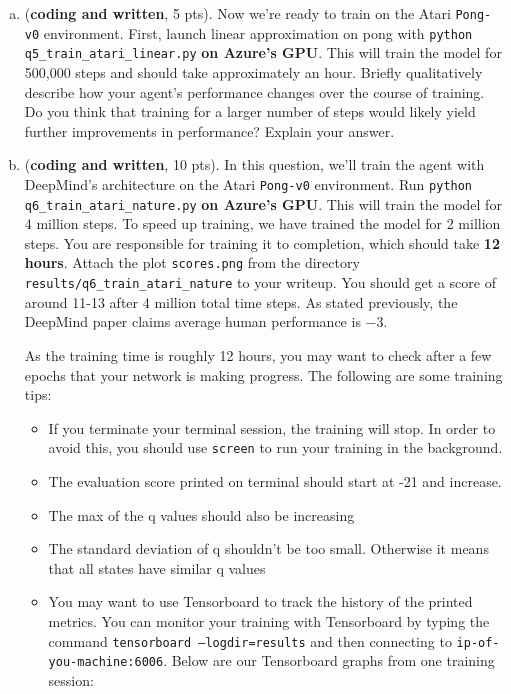 \documentclass{article}
\newif\ifanswers
\newenvironment{myitemize}
{ \begin{itemize}
    \setlength{\itemsep}{0pt}
    \setlength{\parskip}{0pt}
    \setlength{\parsep}{0pt}     }
  { \end{itemize}                  }
\newcommand{\ifans}[1]{\ifanswers \color{red} \textbf{Solution: } #1 \color{black} \else {} \fi}
\begin{document}
\begin{enumerate}[(a)]
\item (\textbf{coding and written}, 5 pts). Now we're ready to train on the Atari \texttt{Pong-v0} environment. First, launch linear approximation on pong with \texttt{python q5\_train\_atari\_linear.py} \textbf{on Azure's GPU}. This will train the model for 500,000 steps and should take approximately an hour.  Briefly qualitatively describe how your agent's performance changes over the course of training. Do you think that training for a larger number of steps would likely yield further improvements in performance? Explain your answer.

\ifans{
}

\item (\textbf{coding and written}, 10 pts). In this question, we'll train the agent with DeepMind's architecture on the Atari \texttt{Pong-v0} environment. Run \texttt{python q6\_train\_atari\_nature.py} \textbf{on Azure's GPU}.  This will train the model for 4 million steps. To speed up training, we have trained the model for 2 million steps. You are responsible for training it to completion, which should take \textbf{12 hours}. Attach the plot \texttt{scores.png} from the directory \texttt{results/q6\_train\_atari\_nature} to your writeup.
You should get a score of around 11-13 after 4 million total time steps.  As stated previously, the DeepMind paper claims average human performance is $ -3 $.


\ifans{
}

As the training time is roughly 12 hours, you may want to check after a few epochs that your network is making progress.  The following are some training tips:

\begin{myitemize}
\item If you terminate your terminal session, the training will stop.  In order to avoid this, you should use \texttt{screen} to run your training in the background.
\item The evaluation score printed on terminal should start at -21 and increase.
\item The max of the q values should also be increasing
\item The standard deviation of q shouldn't be too small. Otherwise it means that all states have similar q values
\item You may want to use Tensorboard to track the history of the printed metrics. You can monitor your training with Tensorboard by typing the command \texttt{tensorboard --logdir=results} and then connecting to \texttt{ip-of-you-machine:6006}.  Below are our Tensorboard graphs from one training session:
\end{myitemize}


\end{enumerate}
\end{document}

